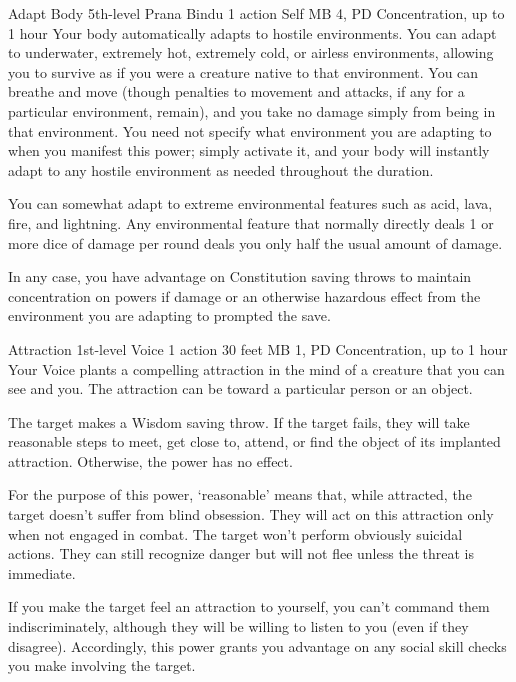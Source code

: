 \DndPowerHeader%
  {Adapt Body}
  {5th-level Prana Bindu}
  {1 action}
  {Self}
  {MB 4, PD \lvlfive}
  {Concentration, up to 1 hour}
Your body automatically adapts to hostile environments.
You can adapt to underwater, extremely hot, extremely cold,
or airless environments, allowing you to survive
as if you were a creature native to that environment.
You can breathe and move (though penalties to movement and attacks,
if any for a particular environment, remain),
and you take no damage simply from being in that environment.
You need not specify what environment you are adapting to
when you manifest this power;
simply activate it,
and your body will instantly adapt to any hostile environment
as needed throughout the duration.

You can somewhat adapt to extreme environmental features such as acid,
lava, fire, and lightning.
Any environmental feature that normally directly deals
1 or more dice of damage per round
deals you only half the usual amount of damage.

In any case,
you have advantage on Constitution saving throws to maintain
concentration on powers if damage or an otherwise
hazardous effect from the environment you are adapting to
prompted the save.

\DndPowerHeader%
  {Attraction}
  {1st-level Voice}
  {1 action}
  {30 feet}
  {MB 1, PD \lvlone}
  {Concentration, up to 1 hour}
Your Voice plants a compelling attraction
in the mind of a creature
that you can see and you.
The attraction can be toward a particular person or an object.

The target makes a Wisdom saving throw.
If the target fails, they will take reasonable steps to meet,
get close to, attend, or find the object of its implanted attraction.
Otherwise, the power has no effect.

For the purpose of this power, `reasonable' means that, while attracted,
the target doesn't suffer from blind obsession.
They will act on this attraction only when not engaged in combat.
The target won't perform obviously suicidal actions.
They can still recognize danger but will not flee
unless the threat is immediate.

If you make the target feel an attraction to yourself,
you can't command them indiscriminately,
although they will be willing to listen to you (even if they disagree).
Accordingly, this power grants you advantage on any social skill checks
you make involving the target.

